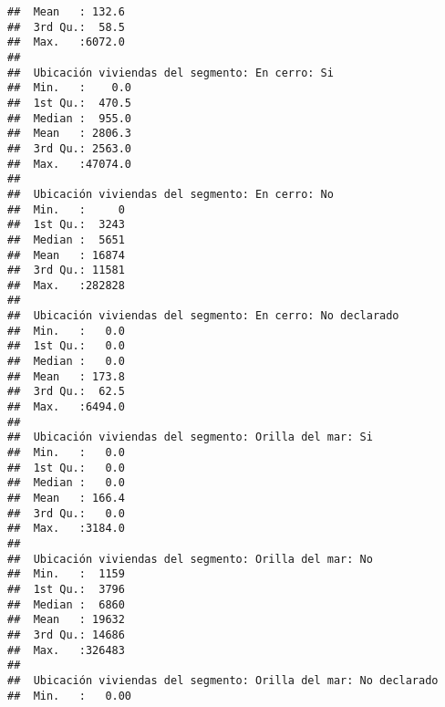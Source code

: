 \documentclass[11pt,]{article}
\begin{document}
\begin{verbatim}
##  Mean   : 132.6                                                   
##  3rd Qu.:  58.5                                                   
##  Max.   :6072.0                                                   
##                                                                   
##  Ubicación viviendas del segmento: En cerro: Si
##  Min.   :    0.0                               
##  1st Qu.:  470.5                               
##  Median :  955.0                               
##  Mean   : 2806.3                               
##  3rd Qu.: 2563.0                               
##  Max.   :47074.0                               
##                                                
##  Ubicación viviendas del segmento: En cerro: No
##  Min.   :     0                                
##  1st Qu.:  3243                                
##  Median :  5651                                
##  Mean   : 16874                                
##  3rd Qu.: 11581                                
##  Max.   :282828                                
##                                                
##  Ubicación viviendas del segmento: En cerro: No declarado
##  Min.   :   0.0                                          
##  1st Qu.:   0.0                                          
##  Median :   0.0                                          
##  Mean   : 173.8                                          
##  3rd Qu.:  62.5                                          
##  Max.   :6494.0                                          
##                                                          
##  Ubicación viviendas del segmento: Orilla del mar: Si
##  Min.   :   0.0                                      
##  1st Qu.:   0.0                                      
##  Median :   0.0                                      
##  Mean   : 166.4                                      
##  3rd Qu.:   0.0                                      
##  Max.   :3184.0                                      
##                                                      
##  Ubicación viviendas del segmento: Orilla del mar: No
##  Min.   :  1159                                      
##  1st Qu.:  3796                                      
##  Median :  6860                                      
##  Mean   : 19632                                      
##  3rd Qu.: 14686                                      
##  Max.   :326483                                      
##                                                      
##  Ubicación viviendas del segmento: Orilla del mar: No declarado
##  Min.   :   0.00                                               

\end{verbatim}
\end{document}
